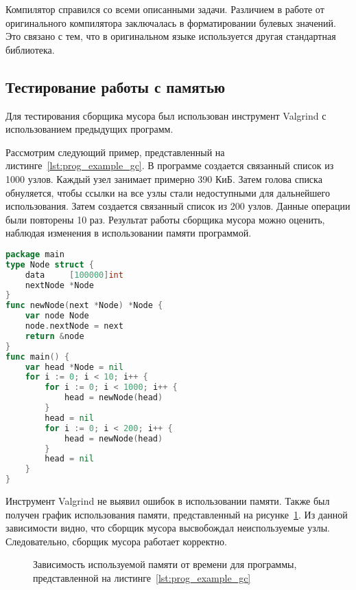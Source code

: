 Компилятор справился со всеми описанными задачи.
Различием в работе от оригинального компилятора заключалась в форматировании булевых значений.
Это связано с тем, что в оригинальном языке используется другая стандартная библиотека.

\subsection*{Тестирование работы с памятью}

Для тестирования сборщика мусора был использован инструмент Valgrind с использованием предыдущих программ.

Рассмотрим следующий пример, представленный на листинге~\ref{lst:prog_example_gc}.
В программе создается связанный список из 1000 узлов.
Каждый узел занимает примерно 390 КиБ.
Затем голова списка обнуляется, чтобы ссылки на все узлы стали недоступными для дальнейшего использования.
Затем создается связанный список из 200 узлов.
Данные операции были повторены 10 раз.
Результат работы сборщика мусора можно оценить, наблюдая изменения в использовании памяти программой.

\begin{lstlisting}[label=lst:prog_example_gc,language=go,basicstyle=\scriptsize,numberstyle=\tiny,caption={Программа для тестирования сборщика мусора}]
package main
type Node struct {
	data     [100000]int
	nextNode *Node
}
func newNode(next *Node) *Node {
	var node Node
	node.nextNode = next
	return &node
}
func main() {
	var head *Node = nil
	for i := 0; i < 10; i++ {
		for i := 0; i < 1000; i++ {
			head = newNode(head)
		}
		head = nil
		for i := 0; i < 200; i++ {
			head = newNode(head)
		}
		head = nil
	}
}
\end{lstlisting}

Инструмент Valgrind не выявил ошибок в использовании памяти.
Также был получен график использования памяти, представленный на рисунке~\ref{fig:valgrind-massif}.
Из данной зависимости видно, что сборщик мусора высвобождал неиспользуемые узлы.
Следовательно, сборщик мусора работает корректно.

\begin{figure}[h]
	\centering

	

	\caption{Зависимость используемой памяти от времени для программы, представленной на листинге~\ref{lst:prog_example_gc}}
	\label{fig:valgrind-massif}
\end{figure}


